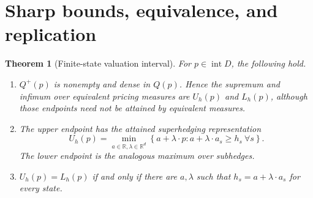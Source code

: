 \documentclass[11pt,a4paper]{article}
\newtheorem{theorem}{Theorem}[section]
\theoremstyle{remark}
\newcommand{\R}{\mathbb R}
\begin{document}
\section{Sharp bounds, equivalence, and replication}
\begin{theorem}[Finite-state valuation interval]
For $p\in\operatorname{int}D$, the following hold.
\begin{enumerate}
\item $Q^+(p)$ is nonempty and dense in $Q(p)$. Hence the supremum and infimum over equivalent pricing measures are $U_h(p)$ and $L_h(p)$, although those endpoints need not be attained by equivalent measures.
\item The upper endpoint has the attained superhedging representation
\[
 U_h(p)=\min_{a\in\R,\lambda\in\R^d}
 \left\{a+\lambda\cdot p:a+\lambda\cdot a_s\ge h_s\ \forall s\right\}.
\]
The lower endpoint is the analogous maximum over subhedges.
\item $U_h(p)=L_h(p)$ if and only if there are $a,\lambda$ such that $h_s=a+\lambda\cdot a_s$ for every state.
\end{enumerate}
\end{theorem}
\end{document}
